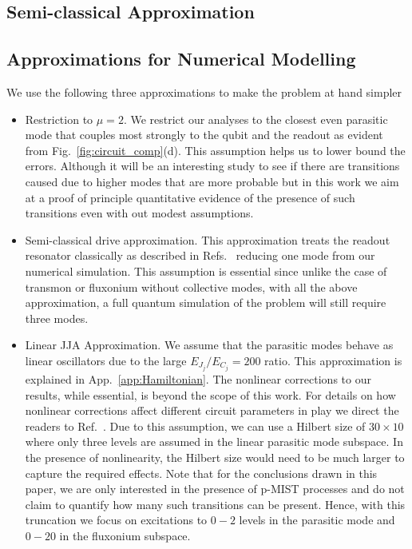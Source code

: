 \documentclass[%
reprint,
superscriptaddress,
 amsmath,amssymb,
 aps,
 prx,
longbibliography,
floatfix,
]{revtex4-2}
\begin{document}
\subsection{Semi-classical Approximation}\label{app:semi-classical}
\subsection{Approximations for Numerical Modelling}\label{app:numerics}
We use the following three approximations to make the problem at hand simpler
\begin{itemize}
    \item Restriction to $\mu=2$. We restrict our analyses to the closest even parasitic mode that couples most strongly to the qubit and the readout as evident from Fig.~\ref{fig:circuit_comp}(d). This assumption helps us to lower bound the errors. Although it will be an interesting study to see if there are transitions caused due to higher modes that are more probable but in this work we aim at a proof of principle quantitative evidence of the presence of such transitions even with out modest assumptions.

    \item Semi-classical drive approximation. This approximation treats the readout resonator classically as described in Refs.~\cite{xiao2023diagrammatic,dumas2024unified,cohen2023reminiscence,khezri2023measurement} reducing one mode from our numerical simulation. This assumption is essential since unlike the case of transmon or fluxonium without collective modes, with all the above approximation, a full quantum simulation of the problem will still require three modes.

    \item Linear JJA Approximation. We assume that the parasitic modes behave as linear oscillators due to the large $E_{J_j}/E_{C_j}=200$ ratio. This approximation is explained in App.~\ref{app:Hamiltonian}. The nonlinear corrections to our results, while essential, is beyond the scope of this work. For details on how nonlinear corrections affect different circuit parameters in play we direct the readers to Ref.~\cite{viola2015collective}. Due to this assumption, we can use a Hilbert size of $30\times 10$ where only three levels are assumed in the linear parasitic mode subspace. In the presence of nonlinearity, the Hilbert size would need to be much larger to capture the required effects. Note that for the conclusions drawn in this paper, we are only interested in the presence of p-MIST processes and do not claim to quantify how many such transitions can be present. Hence, with this truncation we focus on excitations to $0-2$ levels in the parasitic mode and $0-20$ in the fluxonium subspace.
\end{itemize}
\end{document}
